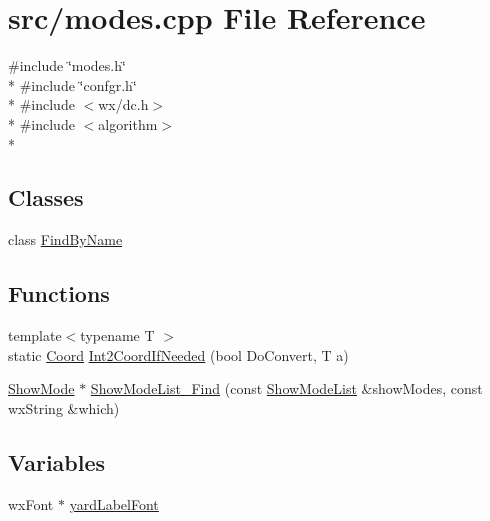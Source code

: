 \hypertarget{a00235}{\section{src/modes.cpp File Reference}
\label{a00235}
}
{\ttfamily \#include \char`\"{}modes.\-h\char`\"{}}\\*
{\ttfamily \#include \char`\"{}confgr.\-h\char`\"{}}\\*
{\ttfamily \#include $<$wx/dc.\-h$>$}\\*
{\ttfamily \#include $<$algorithm$>$}\\*
\subsection*{Classes}
\begin{DoxyCompactItemize}
\item 
class \hyperlink{a00104}{Find\-By\-Name}
\end{DoxyCompactItemize}
\subsection*{Functions}
\begin{DoxyCompactItemize}
\item 
{\footnotesize template$<$typename T $>$ }\\static \hyperlink{a00216_acd9dae57b712df0e2d3588c0c4798c11}{Coord} \hyperlink{a00235_a4ed0b2d58de196b2faf7debfea6c718a}{Int2\-Coord\-If\-Needed} (bool Do\-Convert, T a)
\item 
\hyperlink{a00140}{Show\-Mode} $\ast$ \hyperlink{a00235_afa24aef33f76cbcb08077f91f5668865}{Show\-Mode\-List\-\_\-\-Find} (const \hyperlink{a00236_a39f2aa1ac0d2da59ef7f3e58b13f44d2}{Show\-Mode\-List} \&show\-Modes, const wx\-String \&which)
\end{DoxyCompactItemize}
\subsection*{Variables}
\begin{DoxyCompactItemize}
\item 
wx\-Font $\ast$ \hyperlink{a00235_a061dd63e6da56a0132c090a54efcd35c}{yard\-Label\-Font}
\end{DoxyCompactItemize}


